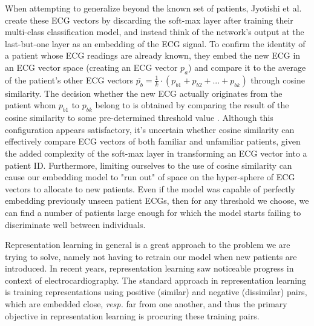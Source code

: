 \documentclass[preprint,12pt]{elsarticle}
\begin{document}
When attempting to generalize beyond the known set of patients, Jyotishi et al. \cite{jyotishi2021ecg} create these ECG vectors by discarding the soft-max layer after training their multi-class classification model, and instead think of the network's output at the last-but-one layer as an embedding of the ECG signal. To confirm the identity of a patient whose ECG readings are already known, they embed the new ECG in an ECG vector space (creating an ECG vector $p_a$) and compare it to the average of the patient's other ECG vectors $\bar{p_b} = \frac{1}{k} \cdot (p_{b1} + p_{b2} + ... + p_{bk})$ through cosine similarity. The decision whether the new ECG actually originates from the patient whom $p_{b1}$ to $p_{bk}$ belong to is obtained by comparing the result of the cosine similarity to some pre-determined threshold value \cite{jyotishi2021ecg}. Although this configuration appears satisfactory, it's uncertain whether cosine similarity can effectively compare ECG vectors of both familiar and unfamiliar patients, given the added complexity of the soft-max layer in transforming an ECG vector into a patient ID. Furthermore, limiting ourselves to the use of cosine similarity can cause our embedding model to "run out" of space on the hyper-sphere of ECG vectors to allocate to new patients. Even if the model was capable of perfectly embedding previously unseen patient ECGs, then for any threshold we choose, we can find a number of patients large enough for which the model starts failing to discriminate well between individuals. 

Representation learning in general is a great approach to the problem we are trying to solve, namely not having to retrain our model when new patients are introduced. In recent years, representation learning saw noticeable progress in context of electrocardiography. The standard approach in representation learning is training representations using positive (similar) and negative (dissimilar) pairs, which are embedded close, \textit{resp.} far from one another, and thus the primary objective in representation learning is procuring these training pairs.
\end{document}
